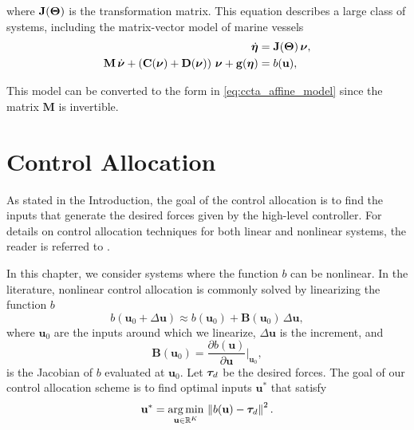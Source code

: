 \noindent where $\mathbf{J}(\bm{\Theta})$ is the transformation matrix. %
This equation describes a large class of systems, including the matrix-vector model of marine vessels \cite{fossen_handbook_2011}
\begin{subequations}
    \begin{align}
        \dot{\pose} &= \mathbf{J}(\bs{\Theta})\,\vel, \\
        \mathbf{M}\,\dot{\vel} + \left(\mathbf{C}(\vel) + \mathbf{D}(\vel)\right)\,\vel + \mathbf{g}(\pose) &= b(\mathbf{u}),%
    \end{align}
    \label{eq:ccta_matrix_model}
    \vspace{-4mm}
\end{subequations}

\noindent This model can be converted to the form in \eqref{eq:ccta_affine_model} since the matrix $\mathbf{M}$ is invertible.

\section{Control Allocation}
\label{sec:ccta_alloc}

As stated in the Introduction, the goal of the control allocation is to find the inputs that generate the desired forces given by the high-level controller.
For details on control allocation techniques for both linear and nonlinear systems, the reader is referred to \cite{johansen_control_2013}.

In this chapter, we consider systems where the function $b$ can be nonlinear.
In the literature, nonlinear control allocation is commonly solved by linearizing the function $b$ \cite{harkegard_dynamic_2004,johansen_constrained_2004}%
\begin{equation}
    b(\mathbf{u}_0 + \Delta\mathbf{u}) \approx b(\mathbf{u}_0) + \mathbf{B}(\mathbf{u}_0)\,\Delta\mathbf{u},
    \label{eq:ccta_forces_approximation}
\end{equation}
where $\mathbf{u}_0$ are the inputs around which we linearize, $\Delta\mathbf{u}$ is the increment, and
\begin{equation}
    \mathbf{B}(\mathbf{u}_0) = \frac{\partial b(\mathbf{u})}{\partial \mathbf{u}}\bigg|_{\mathbf{u}_0},
\end{equation}
is the Jacobian of $b$ evaluated at $\mathbf{u}_0$.
Let $\bm{\tau}_d$ be the desired forces.
The goal of our control allocation scheme is to find optimal inputs $\mathbf{u}^*$ that satisfy
\begin{equation}
    \mathbf{u}^* = \operatorname*{arg\,min}_{\mathbf{u}\in\mathbb{R}^{K}}\,\left\| b(\mathbf{u}) - \bm{\tau}_d \right\|^2.
\end{equation}

